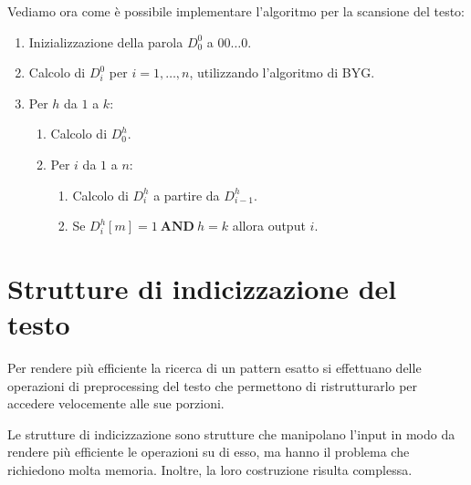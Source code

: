 Vediamo ora come è possibile implementare l'algoritmo per la scansione del testo:
\begin{enumerate}
    \item Inizializzazione della parola $D_0^0$ a $00\dots0$.
    \item Calcolo di $D_i^0$ per $i = 1, \dots, n$, utilizzando l'algoritmo di BYG.
    \item Per $h$ da $1$ a $k$:
          \begin{enumerate}
              \item Calcolo di $D_0^h$.
              \item Per $i$ da $1$ a $n$:
                    \begin{enumerate}
                        \item Calcolo di $D_i^h$ a partire da $D_{i - 1}^h$.
                        \item Se $D_i^h[m] = 1 \ \textbf{AND} \ h = k$ allora output $i$.
                    \end{enumerate}
          \end{enumerate}
\end{enumerate}

\section{Strutture di indicizzazione del testo}
Per rendere più efficiente la ricerca di un pattern esatto si effettuano delle
operazioni di preprocessing del testo che permettono di ristrutturarlo per accedere
velocemente alle sue porzioni.

Le strutture di indicizzazione sono strutture che manipolano l'input in modo da
rendere più efficiente le operazioni su di esso, ma hanno il problema che richiedono
molta memoria. Inoltre, la loro costruzione risulta complessa.

